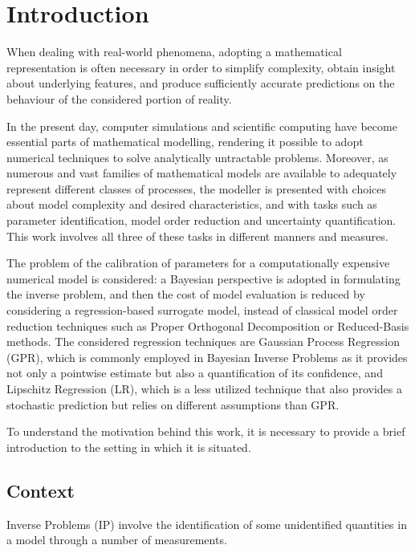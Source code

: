 \section{Introduction} \label{sec:intro}

When dealing with real-world phenomena, adopting a mathematical representation is often necessary in order to simplify complexity, obtain insight about underlying features, and produce sufficiently accurate predictions on the behaviour of the considered portion of reality. 

In the present day, computer simulations and scientific computing have become essential parts of mathematical modelling, rendering it possible to adopt numerical techniques to solve analytically untractable problems.
Moreover, as numerous and vast families of mathematical models are available to adequately represent different classes of processes, the modeller is presented with choices about model complexity and desired characteristics, and with tasks such as parameter identification, model order reduction and uncertainty quantification. 
This work involves all three of these tasks in different manners and measures. 

The problem of the calibration of parameters for a computationally expensive numerical model is considered: a Bayesian perspective is adopted in formulating the inverse problem, and then the cost of model evaluation is reduced by considering a regression-based surrogate model, instead of classical model order reduction techniques such as Proper Orthogonal Decomposition or Reduced-Basis methods.
The considered regression techniques are Gaussian Process Regression (GPR), which is commonly employed in Bayesian Inverse Problems as it provides not only a pointwise estimate but also a quantification of its confidence, and Lipschitz Regression (LR), which is a less utilized technique that also provides a stochastic prediction but relies on different assumptions than GPR. 

To understand the motivation behind this work, it is necessary to provide a brief introduction to the setting in which it is situated.

\subsection{Context}\label{sec:context}

Inverse Problems (IP) involve the identification of some unidentified quantities in a model through a number of measurements.

